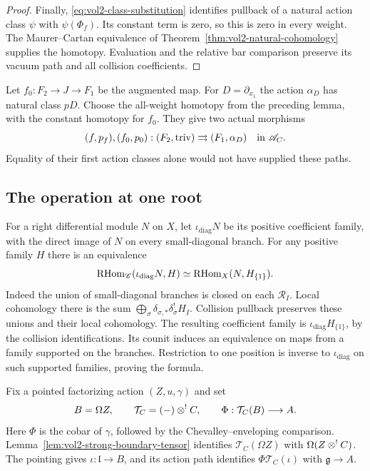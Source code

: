 \begin{proof}
Finally, \eqref{eq:vol2-class-substitution} identifies pullback of a
natural action class $\psi$ with $\psi(\Phi_f)$.
Its constant term is zero, so this is zero in every weight.
The Maurer--Cartan equivalence of
Theorem~\ref{thm:vol2-natural-cohomology} supplies the homotopy.
Evaluation and the relative bar comparison preserve its vacuum
path and all collision coefficients.
\end{proof}

Let $f_0:F_2\to J\to F_1$ be the augmented map.
For $D=\partial_{x_1}$ the action $\alpha_D$ has natural class $pD$.
Choose the all-weight homotopy from the preceding lemma, with the
constant homotopy for $f_0$. They give two actual morphisms
\begin{equation}\label{eq:vol2-pointed-sphere}
 (f,p_f),(f_0,p_0):
 (F_2,\mathrm{triv})\rightrightarrows(F_1,\alpha_D)
 \quad\text{in }\mathscr A_C.
\end{equation}
Equality of their first action classes alone would not have supplied
these paths.

\subsection{The operation at one root}

For a right differential module $N$ on $X$, let
$\iota_{\mathrm{diag}}N$ be its positive coefficient family, with
the direct image of $N$ on every small-diagonal branch.
For any positive family $H$ there is an equivalence
\begin{equation}\label{eq:vol2-main-diagonal-adjunction}
 \operatorname{RHom}_{\mathscr C}(\iota_{\mathrm{diag}}N,H)
       \simeq\operatorname{RHom}_X(N,H_{\{1\}}).
\end{equation}
Indeed the union of small-diagonal branches is closed on each
$\mathscr R_I$. Local cohomology there is the sum
$\bigoplus_\sigma\delta_{\sigma,*}\delta_\sigma^!H_I$.
Collision pullback preserves these unions and their local
cohomology. The resulting coefficient family is
$\iota_{\mathrm{diag}}H_{\{1\}}$, by the collision identifications.
Its counit induces an equivalence on maps from a family supported
on the branches. Restriction to one position is inverse to
$\iota_{\mathrm{diag}}$ on such supported families, proving the
formula.

Fix a pointed factorizing action $(Z,u,\gamma)$ and set
\[
 B=\Omega Z,\qquad
 \mathcal T_C=(-)\mathbin{\otimes^!} C,\qquad
 \Phi:\mathcal T_C(B)\longrightarrow A.
\]
Here $\Phi$ is the cobar of $\gamma$, followed by the
Chevalley--enveloping comparison.
Lemma~\ref{lem:vol2-strong-boundary-tensor} identifies
$\mathcal T_C(\Omega Z)$ with $\Omega(Z\mathbin{\otimes^!} C)$.
The pointing gives $\iota:\mathfrak l\to B$, and its action path
identifies $\Phi\mathcal T_C(\iota)$ with $\mathfrak g\to A$.


